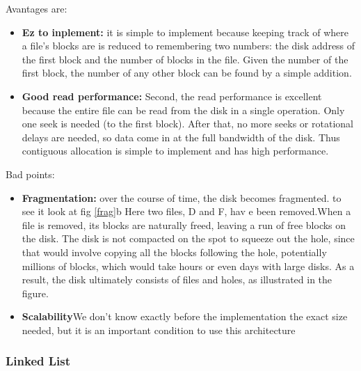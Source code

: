 Avantages are:
\begin{itemize}
    \item \textbf{Ez to inplement: } it is simple to implement because keeping track of where a file’s blocks are is reduced to remembering two numbers: the disk address of the first block and the number of blocks in the file. Given the number of the first block, the number of any other block can be found by a simple addition.
    \item \textbf{Good read performance: }Second, the read performance is excellent because the entire file can be read
    from the disk in a single operation. Only one seek is needed (to the first block).
    After that, no more seeks or rotational delays are needed, so data come in at the
    full bandwidth of the disk. Thus contiguous allocation is simple to implement and
    has high performance.
\end{itemize}
Bad points:
\begin{itemize}
    \item \textbf{Fragmentation: }over the course of time, the disk becomes fragmented. to see it look at fig \ref{frag}b Here two files, D and F, hav e been removed.When a file is removed,
    its blocks are naturally freed, leaving a run of free blocks on the disk. The
    disk is not compacted on the spot to squeeze out the hole, since that would involve
    copying all the blocks following the hole, potentially millions of blocks, which
    would take hours or even days with large disks. As a result, the disk ultimately
    consists of files and holes, as illustrated in the figure.
    \item \textbf{Scalability}We don't know exactly before the implementation the exact size needed, but it is an important condition to use this architecture
\end{itemize}

\subsubsection{Linked List}

